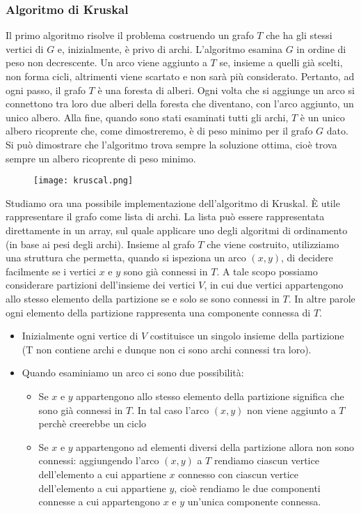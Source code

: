 \subsubsection{Algoritmo di Kruskal}
Il primo algoritmo risolve il problema costruendo un grafo $T$ che ha gli stessi 
vertici di $G$ e, inizialmente, è privo di archi. L'algoritmo esamina $G$
in ordine di peso non decrescente. Un arco viene aggiunto a $T$ se, insieme a 
quelli già scelti, non forma cicli, altrimenti viene scartato e non sarà più considerato.
Pertanto, ad ogni passo, il grafo $T$ è una foresta di alberi. Ogni volta che si aggiunge un arco
si connettono tra loro due alberi della foresta che diventano, con l'arco aggiunto, un unico albero.
Alla fine, quando sono stati esaminati tutti gli archi, $T$ è un unico albero ricoprente che, come dimostreremo, è di peso minimo per il grafo 
$G$ dato.
Si può dimostrare che l'algoritmo trova sempre la soluzione ottima, cioè trova sempre un albero ricoprente di peso minimo.\\
\begin{figure}[h]
    \texttt{[image: kruscal.png]}
\end{figure}
Studiamo ora una possibile implementazione dell'algoritmo di Kruskal. È utile rappresentare 
il grafo come lista di archi. La lista può essere rappresentata direttamente in un array, sul quale applicare uno degli algoritmi di ordinamento (in base ai pesi degli archi).
Insieme al grafo $T$ che viene costruito, utilizziamo una struttura che permetta, quando si ispeziona 
un arco $(x, y)$, di decidere facilmente se i vertici $x$ e $y$ sono già connessi in $T$.
A tale scopo possiamo considerare partizioni dell'insieme dei vertici $V$, in cui due vertici appartengono
allo stesso elemento della partizione se e solo se sono connessi in $T$. In altre 
parole ogni elemento della partizione rappresenta una componente connessa di $T$.
\begin{itemize}
    \item Inizialmente ogni vertice di $V$ costituisce un singolo insieme della partizione (T non contiene archi e dunque non ci sono archi connessi tra loro).
    \item Quando esaminiamo un arco ci sono due possibilità:
    \begin{itemize}
        \item Se $x$ e $y$ appartengono allo stesso elemento della partizione significa 
        che sono già connessi in $T$. In tal caso l'arco $(x,y)$ non viene aggiunto a $T$ perchè creerebbe un ciclo
        \item Se $x$ e $y$ appartengono ad elementi diversi della partizione allora non sono connessi:
        aggiungendo l'arco $(x,y)$ a $T$ rendiamo ciascun vertice dell'elemento a cui appartiene $x$ connesso con ciascun vertice dell'elemento a cui appartiene $y$,
        cioè rendiamo le due componenti connesse a cui appartengono $x$ e $y$ un'unica componente connessa.
    \end{itemize}
\end{itemize}
